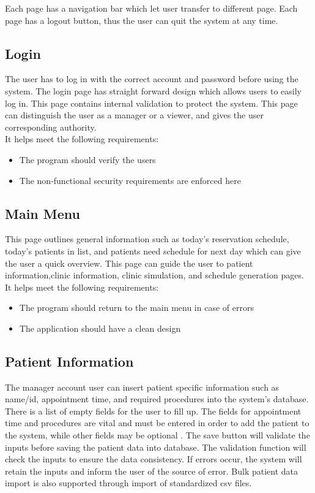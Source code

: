 \documentclass[12pt]{article}
\begin{document}
\noindent \newline
Each page has a navigation bar which let user transfer to different page. Each page has a logout button, thus the user can quit the system at any time.

\subsection{Login}
The user has to log in with the correct account and password before using the system. The login page has straight forward design which allows users to easily log in. This page contains internal validation to protect the system. This page can distinguish the user as a manager or a viewer, and gives the user corresponding authority. 
 \\
It helps meet the following requirements:
\begin{itemize}
	\item The program should verify the users
	\item The non-functional security requirements are enforced here
\end{itemize} 

\subsection{Main Menu}
This page outlines general information such as today’s reservation schedule, today’s patients in list, and patients need schedule for next day which can give the user a quick overview. This page can guide the user to patient information,clinic information, clinic simulation, and schedule generation pages. \\
It helps meet the following requirements:
\begin{itemize}
	\item The program should return to the main menu in case of errors
	\item The application should have a clean design
\end{itemize}

\subsection{Patient Information}
The manager account user can insert patient specific information such as name/id, appointment time, and required procedures into the system’s database. There is a list of empty fields for the user to fill up. The fields for appointment time and procedures are vital and must be entered in order to add the patient to the system, while other fields may be optional . The save button will validate the inputs before saving the patient data into database. The validation function will check the inputs to ensure the data consistency. If errors occur, the system will retain the inputs and inform the user of the source of error. Bulk patient data import is also supported through import of standardized csv files.
\end{document}
